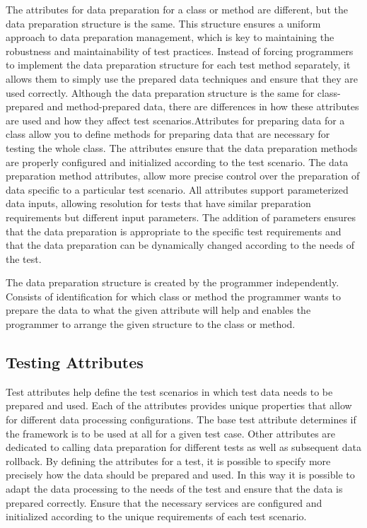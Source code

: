 The attributes for data preparation for a class or method are different, but the data preparation structure is the same. This structure ensures a uniform approach to data preparation management, which is key to maintaining the robustness and maintainability of test practices. Instead of forcing programmers to implement the data preparation structure for each test method separately, it allows them to simply use the prepared data techniques and ensure that they are used correctly.
Although the data preparation structure is the same for class-prepared and method-prepared data, there are differences in how these attributes are used and how they affect test scenarios.Attributes for preparing data for a class allow you to define methods for preparing data that are necessary for testing the whole class. The attributes ensure that the data preparation methods are properly configured and initialized according to the test scenario. The data preparation method attributes, allow more precise control over the preparation of data specific to a particular test scenario. 
All attributes support parameterized data inputs, allowing resolution for tests that have similar preparation requirements but different input parameters. The addition of parameters ensures that the data preparation is appropriate to the specific test requirements and that the data preparation can be dynamically changed according to the needs of the test.

The data preparation structure is created by the programmer independently. Consists of identification for which class or method the programmer wants to prepare the data to what the given attribute will help and enables the programmer to arrange the given structure to the class or method.

\subsection*{Testing Attributes}

Test attributes help define the test scenarios in which test data needs to be prepared and used. Each of the attributes provides unique properties that allow for different data processing configurations. The base test attribute determines if the framework is to be used at all for a given test case. Other attributes are dedicated to calling data preparation for different tests as well as subsequent data rollback. By defining the attributes for a test, it is possible to specify more precisely how the data should be prepared and used. In this way it is possible to adapt the data processing to the needs of the test and ensure that the data is prepared correctly.
Ensure that the necessary services are configured and initialized according to the unique requirements of each test scenario.

